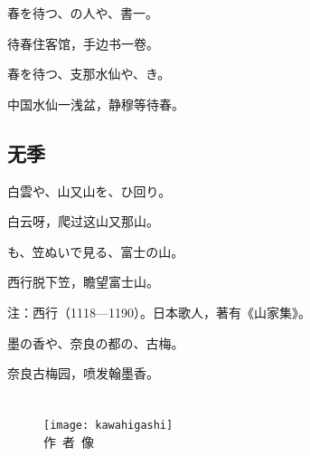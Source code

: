 \begin{haiku}
    {\FH 春を待つ、の人や、書一。}

    {\FK 待春住客馆，手边书一卷。}
\end{haiku}

\begin{haiku}
    {\FH 春を待つ、支那水仙や、き。}

    {\FK 中国水仙一浅盆，静穆等待春。}
\end{haiku}

\section{\FK 无季}

\setcounter{haikucounter}{0}

\begin{haiku}
    {\FH 白雲や、山又山を、ひ回り。}

    {\FK 白云呀，爬过这山又那山。}
\end{haiku}

\begin{haiku}
    {\FH {}も、笠ぬいで見る、富士の山。}

    {\FK 西行脱下笠，瞻望富士山。}

    {\FT 注：西行（1118—1190）。日本歌人，著有《山家集》。}
\end{haiku}

\begin{haiku}
    {\FH 墨の香や、奈良の都の、古梅。}

    {\FK 奈良古梅园，喷发翰墨香。}
\end{haiku}

\chapter[{\FM 河東碧梧桐}]{\FM {}}

\begin{center}
    \begin{figure}
        \centering
        \texttt{[image: kawahigashi]}\\[1em]
        \large{\FS 作~者~像}
    \end{figure}
\end{center}

\newpage

